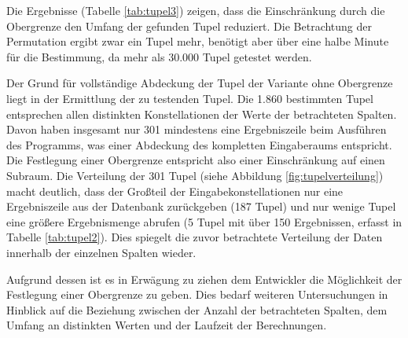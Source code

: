 Die Ergebnisse (Tabelle \ref{tab:tupel3}) zeigen, dass die Einschränkung durch die Obergrenze den Umfang der gefunden Tupel reduziert.
Die Betrachtung der Permutation ergibt zwar ein Tupel mehr, benötigt aber über eine halbe Minute für die Bestimmung, da mehr als 30.000 Tupel getestet werden.

\begin{table}[h]
	\centering
	\caption{Vergleich der evaluierten Ansätze}
	\label{tab:tupel3}
\end{table}

Der Grund für vollständige Abdeckung der Tupel der Variante ohne Obergrenze liegt in der Ermittlung der zu testenden Tupel.
Die 1.860 bestimmten Tupel entsprechen allen distinkten Konstellationen der Werte der betrachteten Spalten.
Davon haben insgesamt nur 301 mindestens eine Ergebniszeile beim Ausführen des Programms, was einer Abdeckung des kompletten Eingaberaums entspricht.
Die Festlegung einer Obergrenze entspricht also einer Einschränkung auf einen Subraum.
Die Verteilung der 301 Tupel (siehe Abbildung \ref{fig:tupelverteilung}) macht deutlich, dass der Großteil der Eingabekonstellationen nur eine Ergebniszeile aus der Datenbank zurückgeben (187 Tupel) und nur wenige Tupel eine größere Ergebnismenge abrufen (5 Tupel mit über 150 Ergebnissen, erfasst in Tabelle \ref{tab:tupel2}).
Dies spiegelt die zuvor betrachtete Verteilung der Daten innerhalb der einzelnen Spalten wieder.

Aufgrund dessen ist es in Erwägung zu ziehen dem Entwickler die Möglichkeit der Festlegung einer Obergrenze zu geben.
Dies bedarf weiteren Untersuchungen in Hinblick auf die Beziehung zwischen der Anzahl der betrachteten Spalten, dem Umfang an distinkten Werten und der Laufzeit der Berechnungen.

